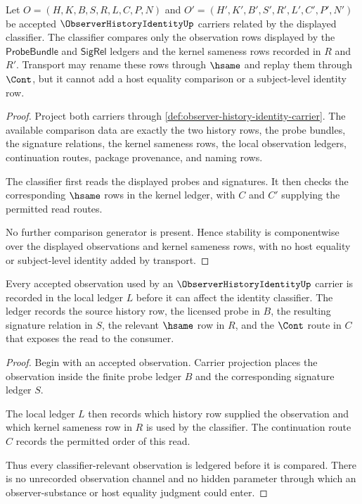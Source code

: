 \begin{theorem}
\label{thm:observer-history-identity-classifier-stability}
Let $O=(H,K,B,S,R,L,C,P,N)$ and $O'=(H',K',B',S',R',L',C',P',N')$ be accepted $\ObserverHistoryIdentityUp$ carriers related by the displayed classifier. The classifier compares only the observation rows displayed by the $\mathsf{ProbeBundle}$ and $\mathsf{SigRel}$ ledgers and the kernel sameness rows recorded in $R$ and $R'$. Transport may rename these rows through $\hsame$ and replay them through $\Cont$, but it cannot add a host equality comparison or a subject-level identity row.
\end{theorem}
\begin{proof}
Project both carriers through \autoref{def:observer-history-identity-carrier}. The available comparison data are exactly the two history rows, the probe bundles, the signature relations, the kernel sameness rows, the local observation ledgers, continuation routes, package provenance, and naming rows.

The classifier first reads the displayed probes and signatures. It then checks the corresponding $\hsame$ rows in the kernel ledger, with $C$ and $C'$ supplying the permitted read routes.

No further comparison generator is present. Hence stability is componentwise over the displayed observations and kernel sameness rows, with no host equality or subject-level identity added by transport.
\end{proof}

\begin{theorem}
\label{thm:observer-history-identity-ledger-exactness}
Every accepted observation used by an $\ObserverHistoryIdentityUp$ carrier is recorded in the local ledger $L$ before it can affect the identity classifier. The ledger records the source history row, the licensed probe in $B$, the resulting signature relation in $S$, the relevant $\hsame$ row in $R$, and the $\Cont$ route in $C$ that exposes the read to the consumer.
\end{theorem}
\begin{proof}
Begin with an accepted observation. Carrier projection places the observation inside the finite probe ledger $B$ and the corresponding signature ledger $S$.

The local ledger $L$ then records which history row supplied the observation and which kernel sameness row in $R$ is used by the classifier. The continuation route $C$ records the permitted order of this read.

Thus every classifier-relevant observation is ledgered before it is compared. There is no unrecorded observation channel and no hidden parameter through which an observer-substance or host equality judgment could enter.
\end{proof}

